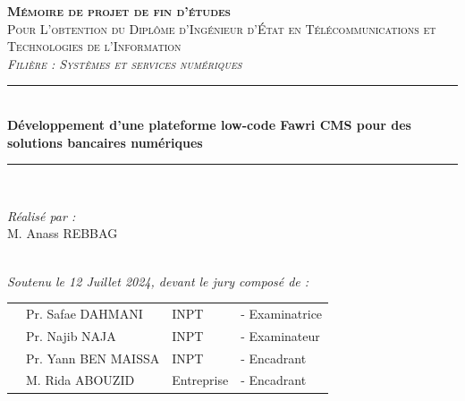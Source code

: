 \vspace{0.9cm}
\begin{center}
    {\large \textsc{\textbf{Mémoire de projet de fin d'études}}}\\[0.1cm]
    {\large \textsc{Pour L'obtention du Diplôme d'Ingénieur d'État en Télécommunications et Technologies de l'Information }}\\[0.1cm]
    {\large \textsc{\textit{Filière : Systèmes et services numériques}}} \\[0.05cm]
    \vspace{-0.04cm}
    \rule{\linewidth}{0.3mm} \\[0.4cm]   %
    { \large \textbf{Développement d'une plateforme low-code Fawri CMS pour des solutions bancaires numériques }} \\[0.01cm]
    \rule{\linewidth}{0.3mm} \\[0.4cm]
    \vspace{0.4cm}


    \vspace{1cm}

    \noindent
    \begin{minipage}{0.9\textwidth}
        \vspace{-7mm}
        \begin{flushleft} \large
            \emph{Réalisé par :}\\
            M. Anass \textsc{REBBAG} %
        \end{flushleft}
    \end{minipage}
    \begin{minipage}{0.4\textwidth}

    \end{minipage}\\[0.6cm]

    {\large \textit{Soutenu le 12 Juillet 2024, devant le jury composé de : }}\\[0.5cm]


    \begin{tabular}{p{1cm}lll}
         & \large Pr. Safae \textsc{DAHMANI}   & \large INPT       & \large - Examinatrice \\[0.1cm]
         & \large Pr. Najib \textsc{NAJA}      & \large INPT       & \large - Examinateur  \\[0.1cm]
         & \large Pr. Yann \textsc{BEN MAISSA} & \large INPT       & \large - Encadrant    \\[0.1cm]
         & \large M. Rida \textsc{ABOUZID}     & \large Entreprise & \large - Encadrant    \\[0.1cm]
    \end{tabular}


\end{center}
